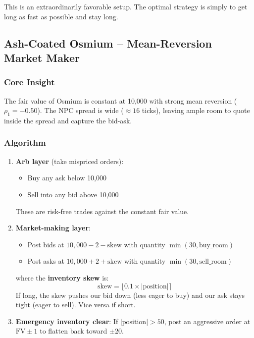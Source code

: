 \documentclass[11pt,a4paper]{article}
\begin{document}
This is an extraordinarily favorable setup. The optimal strategy is simply to get long as fast as possible and stay long.

\subsection{Ash-Coated Osmium -- Mean-Reversion Market Maker}

\subsubsection{Core Insight}

The fair value of Osmium is constant at 10,000 with strong mean reversion ($\rho_1 = -0.50$). The NPC spread is wide ($\approx 16$ ticks), leaving ample room to quote inside the spread and capture the bid-ask.

\subsubsection{Algorithm}

\begin{enumerate}
    \item \textbf{Arb layer} (take mispriced orders):
    \begin{itemize}
        \item Buy any ask below 10,000
        \item Sell into any bid above 10,000
    \end{itemize}
    These are risk-free trades against the constant fair value.

    \item \textbf{Market-making layer}:
    \begin{itemize}
        \item Post bids at $10{,}000 - 2 - \text{skew}$ with quantity $\min(30, \text{buy\_room})$
        \item Post asks at $10{,}000 + 2 + \text{skew}$ with quantity $\min(30, \text{sell\_room})$
    \end{itemize}
    where the \textbf{inventory skew} is:
    \begin{equation}
        \text{skew} = \lfloor 0.1 \times |\text{position}| \rceil
    \end{equation}
    If long, the skew pushes our bid down (less eager to buy) and our ask stays tight (eager to sell). Vice versa if short.

    \item \textbf{Emergency inventory clear}: If $|\text{position}| > 50$, post an aggressive order at $\text{FV} \pm 1$ to flatten back toward $\pm 20$.
\end{enumerate}
\end{document}
